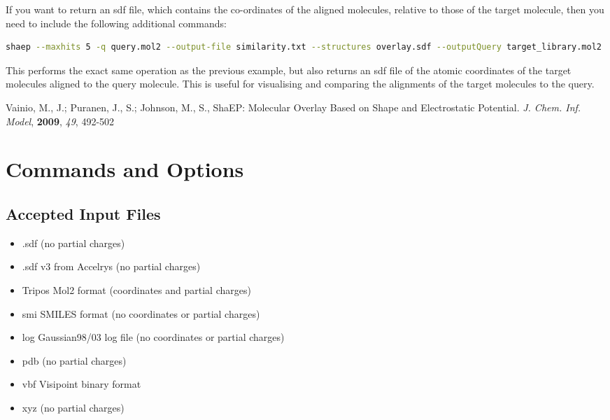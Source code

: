 \documentclass[11pt]{article} %
\begin{document}
If you want to return an sdf file, which contains the co-ordinates of the aligned molecules, relative to those of the target molecule, then you need to include the following additional commands:

\begin{lstlisting}[language=bash]
shaep --maxhits 5 -q query.mol2 --output-file similarity.txt --structures overlay.sdf --outputQuery target_library.mol2
\end{lstlisting}

This performs the exact same operation as the previous example, but also returns an sdf file of the atomic coordinates of the target molecules aligned to the query molecule. This is useful for visualising and comparing the alignments of the target molecules to the query.


\begin{thebibliography}{9}
Vainio, M., J.; Puranen, J., S.; Johnson, M., S.,
ShaEP: Molecular Overlay Based on Shape and Electrostatic Potential. \textit{J. Chem. Inf. Model}, \textbf{2009}, \textit{49},
492-502
\end{thebibliography}

\appendix
\section{Commands and Options}
\subsection{Accepted Input Files}
\begin{itemize}
\item .sdf (no partial charges)
\item .sdf v3 from Accelrys (no partial charges)
\item Tripos Mol2 format (coordinates and partial charges)
\item smi SMILES format (no coordinates or partial charges)
\item log Gaussian98/03 log file (no coordinates or partial charges)
\item pdb (no partial charges)
\item vbf Visipoint binary format
\item xyz (no partial charges)
\end{itemize}

\renewcommand{\arraystretch}{1.5} %
\end{document}
